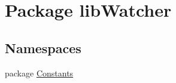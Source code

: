 \hypertarget{namespacelib_watcher}{\section{Package lib\+Watcher}
\label{namespacelib_watcher}
}
\subsection*{Namespaces}
\begin{DoxyCompactItemize}
\item 
package \hyperlink{namespacelib_watcher_1_1_constants}{Constants}
\end{DoxyCompactItemize}
